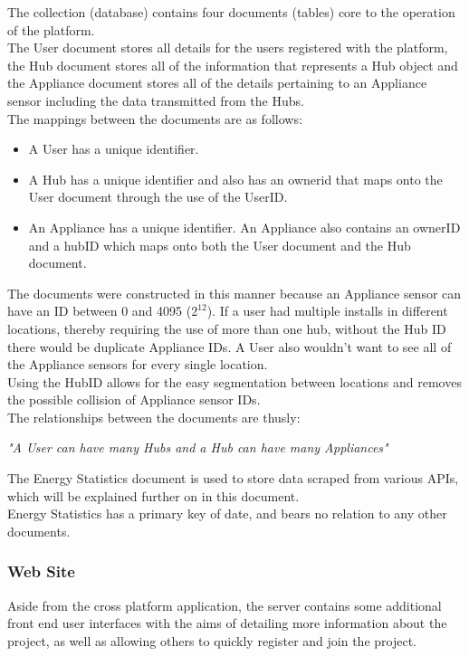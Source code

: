 \documentclass[preprint,12pt,3p]{elsarticle}
\begin{document}
The collection (database) contains four documents (tables) core to the operation of the platform.\\
The User document stores all details for the users registered with the platform, the Hub document stores all of the information that represents a Hub object and the Appliance document stores all of the details pertaining to an Appliance sensor including the data transmitted from the Hubs.\\
The mappings between the documents are as follows:
\begin{itemize}
\item A User has a unique identifier.
\item A Hub has a unique identifier and also has an ownerid that maps onto the User document through the use of the UserID.
\item An Appliance has a unique identifier. An Appliance also contains an ownerID and a hubID which maps onto both the User document and the Hub document.
\end{itemize}
The documents were constructed in this manner because an Appliance sensor can have an ID between 0 and 4095 ($2^{12}$). If a user had multiple installs in different locations, thereby requiring the use of more than one hub, without the Hub ID there would be duplicate Appliance IDs. A User also wouldn't want to see all of the Appliance sensors for every single location.\\ 
Using the HubID allows for the easy segmentation between locations and removes the possible collision of Appliance sensor IDs.\\

The relationships between the documents are thusly:
\begin{center}
    \textit{"A User can have many Hubs and a Hub can have many Appliances"}
\end{center}
The Energy Statistics document is used to store data scraped from various APIs, which will be explained further on in this document.\\
Energy Statistics has a primary key of date, and bears no relation to any other documents. 

\subsubsection{Web Site}
Aside from the cross platform application, the server contains some additional front end user interfaces with the aims of detailing more information about the project, as well as allowing others to quickly register and join the project.\\
\end{document}
